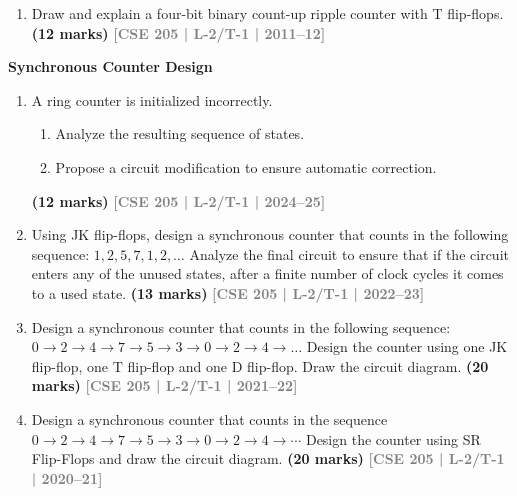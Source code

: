 \documentclass[12pt,a3paper]{article}
\newcommand{\yr}[1]{\hfill\textcolor{gray}{\small\textbf{[#1]}}}
\newcommand{\mk}[1]{\textcolor{orange!70!black}{\small\textbf{(#1 marks)}}}
\newcommand{\subtopic}[2]{%
  \vspace{10pt}
  \noindent\begin{tcolorbox}[colback=#1!8,colframe=#1,boxrule=0.6pt,arc=4pt,
    left=6pt,right=6pt,top=4pt,bottom=4pt]
    \small\bfseries\textcolor{#1}{#2}
  \end{tcolorbox}
  \vspace{2pt}
}
\begin{document}
\begin{enumerate}
\begin{enumerate}
  \end{enumerate}
\mk{8+4+3} \yr{CSE 205 | L-2/T-1 | 2012--13}

\item Draw and explain a four-bit binary count-up ripple counter with T flip-flops.
\mk{12} \yr{CSE 205 | L-2/T-1 | 2011--12}

\end{enumerate}

\subtopic{cG}{Synchronous Counter Design}
\label{sub:s7-sync-counter}

\begin{enumerate}

\item A ring counter is initialized incorrectly.
\begin{enumerate}
  \item Analyze the resulting sequence of states.
  \item Propose a circuit modification to ensure automatic correction.
\end{enumerate}
\mk{12} \yr{CSE 205 | L-2/T-1 | 2024--25}


\item Using JK flip-flops, design a synchronous counter that counts in the following sequence: $1, 2, 5, 7, 1, 2, \ldots$ Analyze the final circuit to ensure that if the circuit enters any of the unused states, after a finite number of clock cycles it comes to a used state.
\mk{13} \yr{CSE 205 | L-2/T-1 | 2022--23}

\item Design a synchronous counter that counts in the following sequence: $0 \to 2 \to 4 \to 7 \to 5 \to 3 \to 0 \to 2 \to 4 \to \ldots$ Design the counter using one JK flip-flop, one T flip-flop and one D flip-flop. Draw the circuit diagram.
\mk{20} \yr{CSE 205 | L-2/T-1 | 2021--22}

\item Design a synchronous counter that counts in the sequence $0 \to 2 \to 4 \to 7 \to 5 \to 3 \to 0 \to 2 \to 4 \to \cdots$ Design the counter using SR Flip-Flops and draw the circuit diagram.
\mk{20} \yr{CSE 205 | L-2/T-1 | 2020--21}


\end{enumerate}
\end{document}
